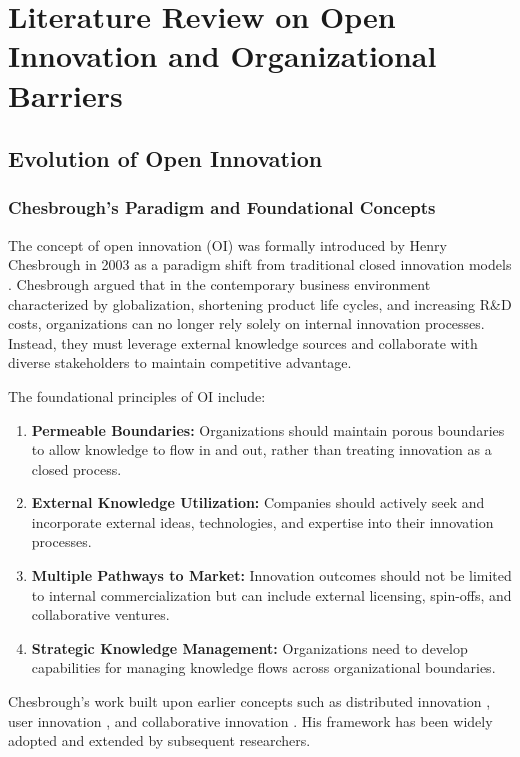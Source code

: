 \chapter{Literature Review on Open Innovation and Organizational Barriers}

\section{Evolution of Open Innovation}

\subsection{Chesbrough's Paradigm and Foundational Concepts}

The concept of open innovation (OI) was formally introduced by Henry Chesbrough in 2003 as a paradigm shift from traditional closed innovation models \citep{chesbrough2003open}. Chesbrough argued that in the contemporary business environment characterized by globalization, shortening product life cycles, and increasing R\&D costs, organizations can no longer rely solely on internal innovation processes. Instead, they must leverage external knowledge sources and collaborate with diverse stakeholders to maintain competitive advantage.

The foundational principles of OI include:
\begin{enumerate}
    \item \textbf{Permeable Boundaries:} Organizations should maintain porous boundaries to allow knowledge to flow in and out, rather than treating innovation as a closed process.
    \item \textbf{External Knowledge Utilization:} Companies should actively seek and incorporate external ideas, technologies, and expertise into their innovation processes.
    \item \textbf{Multiple Pathways to Market:} Innovation outcomes should not be limited to internal commercialization but can include external licensing, spin-offs, and collaborative ventures.
    \item \textbf{Strategic Knowledge Management:} Organizations need to develop capabilities for managing knowledge flows across organizational boundaries.
\end{enumerate}

Chesbrough's work built upon earlier concepts such as distributed innovation \citep{cohen2002distributed}, user innovation \citep{von2003democratizing}, and collaborative innovation \citep{hage1965innovative}. His framework has been widely adopted and extended by subsequent researchers.

